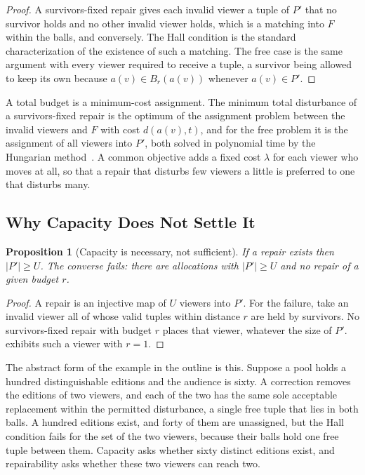 \documentclass[11pt,twoside,openright]{book}
\theoremstyle{plain}
\newtheorem{proposition}[theorem]{Proposition}
\theoremstyle{definition}
\theoremstyle{remark}
\begin{document}
\begin{proof}
A survivors-fixed repair gives each invalid viewer a tuple of $P'$ that no survivor holds and no other invalid viewer holds, which is a matching into $F$ within the balls, and conversely. The Hall condition is the standard characterization of the existence of such a matching. The free case is the same argument with every viewer required to receive a tuple, a survivor being allowed to keep its own because $a(v)\in B_r(a(v))$ whenever $a(v)\in P'$.
\end{proof}

A total budget is a minimum-cost assignment. The minimum total disturbance of a survivors-fixed repair is the optimum of the assignment problem between the invalid viewers and $F$ with cost $d(a(v),t)$, and for the free problem it is the assignment of all viewers into $P'$, both solved in polynomial time by the Hungarian method~\cite{kuhn1955}. A common objective adds a fixed cost $\lambda$ for each viewer who moves at all, so that a repair that disturbs few viewers a little is preferred to one that disturbs many.

\subsection{Why Capacity Does Not Settle It}

\begin{proposition}[Capacity is necessary, not sufficient]\label{prop:necessary}
If a repair exists then $\lvert P'\rvert\ge U$. The converse fails: there are allocations with $\lvert P'\rvert\ge U$ and no repair of a given budget $r$.
\end{proposition}

\begin{proof}
A repair is an injective map of $U$ viewers into $P'$. For the failure, take an invalid viewer all of whose valid tuples within distance $r$ are held by survivors. No survivors-fixed repair with budget $r$ places that viewer, whatever the size of $P'$.  exhibits such a viewer with $r=1$.
\end{proof}

The abstract form of the example in the outline is this. Suppose a pool holds a hundred distinguishable editions and the audience is sixty. A correction removes the editions of two viewers, and each of the two has the same sole acceptable replacement within the permitted disturbance, a single free tuple that lies in both balls. A hundred editions exist, and forty of them are unassigned, but the Hall condition fails for the set of the two viewers, because their balls hold one free tuple between them. Capacity asks whether sixty distinct editions exist, and repairability asks whether these two viewers can reach two.
\end{document}
